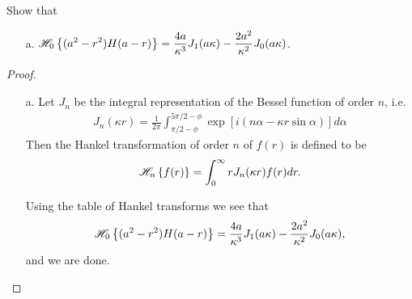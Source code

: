 \begin{problem}{7.1}
  Show that
  \begin{enumerate}
    \item[a.] $\displaystyle \mathscr{H}_{ {0} }\left\{ {(a^2-r^2) H(a-r)} \right\} = \frac{4a}{\kappa^3} J_1(a\kappa ) - \frac{2a^2}{\kappa^2}J_0(a\kappa)$.
  \end{enumerate}
\end{problem}

\begin{proof}
  \begin{enumerate}
    \item[a.] Let $J_n$ be the integral representation of the Bessel function of order $n$, i.e.
      \begin{align*}
        J_n(\kappa r) = \frac{1}{2\pi }\int_{\pi/2 - \phi}^{5\pi/2 - \phi} \exp{\left[i(n\alpha - \kappa r \sin \alpha)\right]} d\alpha
      \end{align*}
      Then the Hankel transformation of order $n$ of $f(r)$ is defined to be
      \begin{align*}
        \mathscr{H}_{ {n} }\left\{ {f(r)} \right\} = \int_0^\infty r J_n(\kappa r) f(r) dr.
      \end{align*}

      Using the table of Hankel transforms we see that
      \begin{align*}
        \mathscr{H}_{ {0} }\left\{ {(a^2-r^2) H(a-r)} \right\} = \frac{4a}{\kappa^3} J_1(a\kappa ) - \frac{2a^2}{\kappa^2}J_0(a\kappa),
      \end{align*}
      and we are done.
  \end{enumerate}
\end{proof}
\newpage
